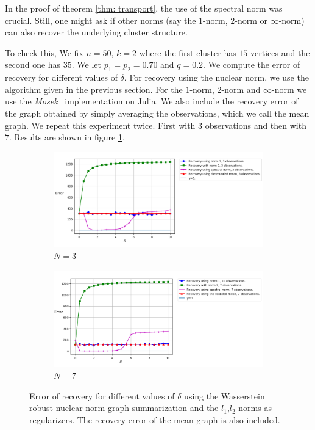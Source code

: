 \documentclass[12pt]{amsart}
\theoremstyle{remark}
\begin{document}
In the proof of theorem \ref{thm: transport}, the use of the spectral norm was crucial. Still, one might ask if other norms (say the $1$-norm, $2$-norm or $\infty$-norm) can also recover the underlying cluster structure.

To check this, We fix $n=50$, $k=2$ where the first cluster has $15$ vertices and the second one has $35$. We let $p_1 = p_2 = 0.70$ and $q=0.2$. We compute the error of recovery for different values of $\delta$. For recovery using the nuclear norm, we use the algorithm given in the previous section. For the $1$-norm, $2$-norm and $\infty$-norm we use the \textit{Mosek}~\cite{Mosek} implementation on Julia. 
We also include the recovery error of the graph obtained by simply averaging the observations, which we call the mean graph.
We repeat this experiment twice. First with $3$ observations and then with $7$.
Results are shown in figure \ref{fig:differentNorms}.


\begin{figure}
     \centering
     \begin{subfigure}[b]{1\textwidth}
         \centering
         \includegraphics[width=\textwidth]{./Pictures/differentNorms.PNG}
\caption{$N=3$}
     \end{subfigure}
     \hfill
     \begin{subfigure}[b]{1\textwidth}
         \centering
         \includegraphics[width=\textwidth]{./Pictures/differentNorms7.PNG}
         \caption{$N=7$}
     \end{subfigure}
\caption{Error of recovery for different values of $\delta$ using the Wasserstein robust nuclear norm graph summarization and the $l_1$,$l_2$ norms as regularizers. The recovery error of the mean graph is also included.}
        \label{fig:differentNorms}
\end{figure}
\end{document}
